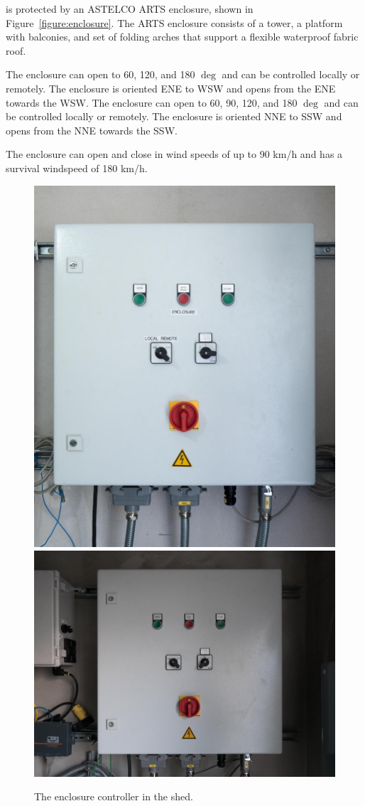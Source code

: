 {\projectname} is protected by an ASTELCO ARTS enclosure, shown in Figure~\ref{figure:enclosure}. The ARTS enclosure consists of a tower, a platform with balconies, and set of folding arches that support a flexible waterproof fabric roof. 


\ifcoatlioan
The enclosure can open to 60, 120, and 180 $\deg$ and can be controlled locally or remotely. The enclosure is oriented ENE to WSW and opens from the ENE towards the WSW.
\fi
\ifddotioan
The enclosure can open to 60, 90, 120, and 180 $\deg$ and can be controlled locally or remotely. The enclosure is oriented NNE to SSW and opens from the NNE towards the SSW.
\fi


The enclosure can open and close in wind speeds of up to 90 km/h and has a survival windspeed of 180 km/h.

\begin{figure}
\begin{center}
\ifcoatlioan
\includegraphics[width=0.6\linewidth]{figures/enclosure-coatlioan-controller.jpg}
\fi
\ifddotioan
\includegraphics[width=0.6\linewidth]{figures/enclosure-ddotioan-controller.jpg}
\fi
\end{center}
\caption{The enclosure controller in the shed.}
\label{figure:enclosure-controller}
\end{figure}

